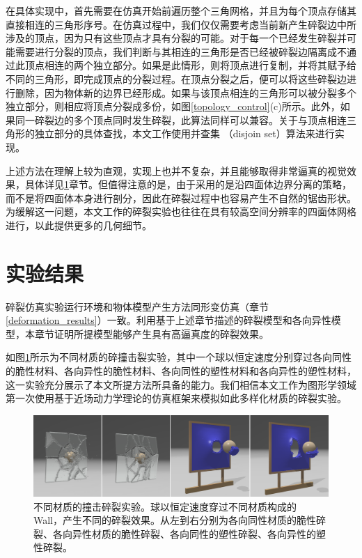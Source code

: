 在具体实现中，首先需要在仿真开始前遍历整个三角网格，并且为每个顶点存储其直接相连的三角形序号。在仿真过程中，我们仅仅需要考虑当前新产生碎裂边中所涉及的顶点，因为只有这些顶点才具有分裂的可能。对于每一个已经发生碎裂并可能需要进行分裂的顶点，我们判断与其相连的三角形是否已经被碎裂边隔离成不通过此顶点相连的两个独立部分。如果是此情形，则将顶点进行复制，并将其赋予给不同的三角形，即完成顶点的分裂过程。在顶点分裂之后，便可以将这些碎裂边进行删除，因为物体新的边界已经形成。如果与该顶点相连的三角形可以被分裂多个独立部分，则相应将顶点分裂成多份，如图\ref{topology_control}(c)所示。此外，如果同一碎裂边的多个顶点同时发生碎裂，此算法同样可以兼容。关于与顶点相连三角形的独立部分的具体查找，本文工作使用并查集 （disjoin set）算法来进行实现。

上述方法在理解上较为直观，实现上也并不复杂，并且能够取得非常逼真的视觉效果，具体详见\ref{fracture_results}章节。但值得注意的是，由于采用的是沿四面体边界分离的策略，而不是将四面体本身进行剖分，因此在碎裂过程中也容易产生不自然的锯齿形状。为缓解这一问题，本文工作的碎裂实验也往往在具有较高空间分辨率的四面体网格进行，以此提供更多的几何细节。


\section{实验结果}
\label{fracture_results}
碎裂仿真实验运行环境和物体模型产生方法同形变仿真（章节\ref{deformation_results}）一致。利用基于上述章节描述的碎裂模型和各向异性模型，本章节证明所提模型能够产生具有高逼真度的碎裂效果。

如图\ref{demo_impact}所示为不同材质的碎撞击裂实验，其中一个球以恒定速度分别穿过各向同性的脆性材料、各向异性的脆性材料、各向同性的塑性材料和各向异性的塑性材料，这一实验充分展示了本文所提方法所具备的能力。我们相信本文工作为图形学领域第一次使用基于近场动力学理论的仿真框架来模拟如此多样化材质的碎裂实验。

\begin{figure}[!htb]
  \centering
  \captionsetup{justification=centering}
  \includegraphics[width=\linewidth]{chap/image/demo_impact}

  \caption{\label{demo_impact}
           不同材质的撞击碎裂实验。球以恒定速度穿过不同材质构成的 Wall，产生不同的碎裂效果。从左到右分别为各向同性材质的脆性碎裂、各向异性材质的脆性碎裂、各向同性的塑性碎裂、各向异性的塑性碎裂。
          }
\end{figure}

